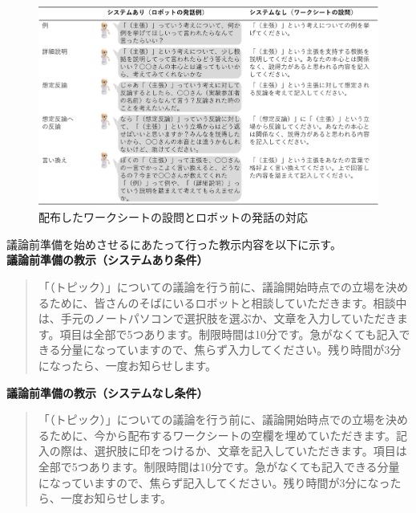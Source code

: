 \documentclass[11pt, a4paper]{jreport} %
\begin{document}
\begin{figure}[htbp]

\begin{center}

\includegraphics[width=150mm]{images/ワークとシステムの対応.png}
\caption{配布したワークシートの設問とロボットの発話の対応}
\label{fig:対応表}
\end{center}
\end{figure}

議論前準備を始めさせるにあたって行った教示内容を以下に示す。\\

\textbf{議論前準備の教示（システムあり条件）}
\begin{quote}
「（トピック）」についての議論を行う前に、議論開始時点での立場を決めるために、皆さんのそばにいるロボットと相談していただきます。相談中は、手元のノートパソコンで選択肢を選ぶか、文章を入力していただきます。項目は全部で5つあります。制限時間は10分です。急がなくても記入できる分量になっていますので、焦らず入力してください。残り時間が3分になったら、一度お知らせします。
\end{quote}

\textbf{議論前準備の教示（システムなし条件）}
\begin{quote}
「（トピック）」についての議論を行う前に、議論開始時点での立場を決めるために、今から配布するワークシートの空欄を埋めていただきます。記入の際は、選択肢に印をつけるか、文章を記入していただきます。項目は全部で5つあります。制限時間は10分です。急がなくても記入できる分量になっていますので、焦らず記入してください。残り時間が3分になったら、一度お知らせします。
\end{quote}
\end{document}
